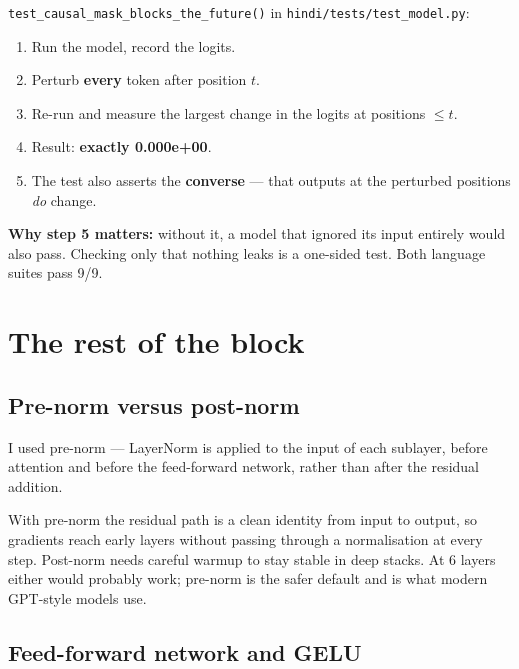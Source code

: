 \documentclass[11pt]{report}
\begin{document}
\begin{tcolorbox}[colback=conceptgreen!6,colframe=conceptgreen,
  title={\textbf{How my test verifies it}}]
\texttt{test\_causal\_mask\_blocks\_the\_future()} in
\texttt{hindi/tests/test\_model.py}:
\begin{enumerate}
\item Run the model, record the logits.
\item Perturb \textbf{every} token after position $t$.
\item Re-run and measure the largest change in the logits at positions $\le t$.
\item Result: \textbf{exactly 0.000e+00}.
\item The test also asserts the \textbf{converse} --- that outputs at the
perturbed positions \emph{do} change.
\end{enumerate}
\textbf{Why step 5 matters:} without it, a model that ignored its input entirely
would also pass. Checking only that nothing leaks is a one-sided test. Both
language suites pass 9/9.
\end{tcolorbox}

\section{The rest of the block}

\subsection{Pre-norm versus post-norm}

\begin{shortans}
I used pre-norm --- LayerNorm is applied to the input of each sublayer, before
attention and before the feed-forward network, rather than after the residual
addition.
\end{shortans}

\begin{deeper}
With pre-norm the residual path is a clean identity from input to output, so
gradients reach early layers without passing through a normalisation at every
step. Post-norm needs careful warmup to stay stable in deep stacks. At 6 layers
either would probably work; pre-norm is the safer default and is what modern
GPT-style models use.
\end{deeper}

\subsection{Feed-forward network and GELU}
\end{document}
